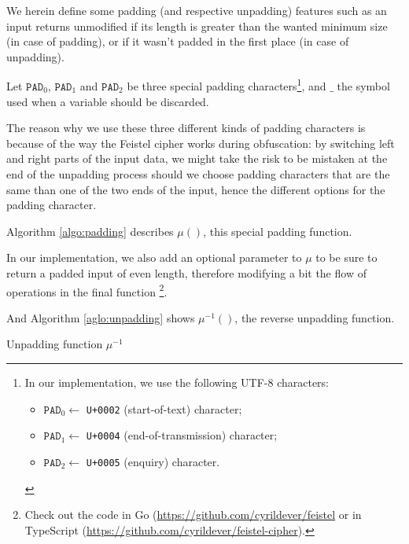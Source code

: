 \documentclass[twoside,twocolumn]{article}
\theoremstyle{definition}
\theoremstyle{remark}
\begin{document}
We herein define some padding (and respective unpadding) features such as an input returns unmodified if its length is greater than the wanted minimum 
size (in case of padding), or if it wasn't padded in the first place (in case of unpadding).

Let $\texttt{PAD}_0$, $\texttt{PAD}_1$ and $\texttt{PAD}_2$ be three special padding characters\footnote{In our implementation, we use the following 
UTF-8 characters:
\begin{itemize}
    \item $\texttt{PAD}_0 \gets$ \texttt{U+0002} (start-of-text) character;
    \item $\texttt{PAD}_1 \gets$ \texttt{U+0004} (end-of-transmission) character;
    \item $\texttt{PAD}_2 \gets$ \texttt{U+0005} (enquiry) character.
\end{itemize}}, and $\_$ the symbol used when a variable should be discarded.

The reason why we use these three different kinds of padding characters is because of the way the Feistel cipher works during obfuscation: by switching 
left and right parts of the input data, we might take the risk to be mistaken at the end of the unpadding process should we choose padding characters 
that are the same than one of the two ends of the input, hence the different options for the padding character.

Algorithm \ref{algo:padding} describes $\mathcal{\mu}()$, this special padding function.

In our implementation, we also add an optional parameter to $\mathcal{\mu}$ to be sure to return a padded input of even length, therefore modifying a bit 
the flow of operations in the final function \footnote{Check out the code in Go (\url{https://github.com/cyrildever/feistel} or in TypeScript  
(\url{https://github.com/cyrildever/feistel-cipher}).}.

And Algorithm \ref{aglo:unpadding} shows $\mathcal{\mu}^{-1}()$, the reverse unpadding function.

\begin{algorithm}
    \caption{Unpadding function $\mathcal{\mu}^{-1}$}
    \label{aglo:unpadding}
\end{algorithm}
\end{document}
